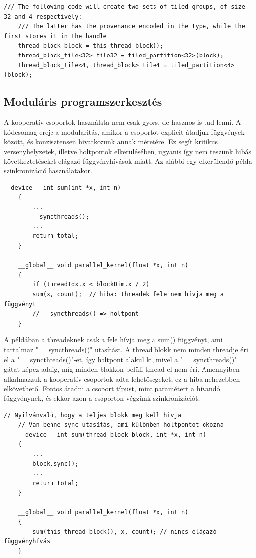 \begin{lstlisting}[style=CStyle]
	/// The following code will create two sets of tiled groups, of size 32 and 4 respectively:
	/// The latter has the provenance encoded in the type, while the first stores it in the handle
	thread_block block = this_thread_block();
	thread_block_tile<32> tile32 = tiled_partition<32>(block);
	thread_block_tile<4, thread_block> tile4 = tiled_partition<4>(block);
\end{lstlisting}

\subsection{Moduláris programszerkesztés}
A kooperatív csoportok használata nem csak gyors, de hasznos is tud lenni. A kódcsomag ereje a modularitás, amikor a csoportot explicit átadjuk függvények között, és konzisztensen hivatkozunk annak méretére. Ez segít kritikus versenyhelyzetek, illetve holtpontok elkerülésében, ugyanis így nem teszünk hibás következtetéseket elágazó függvényhívások miatt. Az alábbi egy elkerülendő példa szinkronizáció használatakor.
\begin{lstlisting}[style=CStyle]
	__device__ int sum(int *x, int n) 
	{
		...
		__syncthreads();
		...
		return total;
	}
	
	__global__ void parallel_kernel(float *x, int n)
	{
		if (threadIdx.x < blockDim.x / 2)
		sum(x, count);  // hiba: threadek fele nem hívja meg a függvényt
		// __syncthreads() => holtpont
	}
\end{lstlisting}

A példában a threadeknek csak a fele hívja meg a sum() függvényt, ami tartalmaz "\_\_syncthreads()" utasítást. A thread blokk nem minden threadje éri el a "\_\_syncthreads()"-et, így holtpont alakul ki, mivel a "\_\_syncthreads()" gátat képez addig, míg minden blokkon belüli thread el nem éri.
Amennyiben alkalmazzuk a kooperatív csoportok adta lehetőségeket, ez a hiba nehezebben elkövethető. Fontos átadni a csoport típust, mint paramétert a hívandó függvénynek, és ekkor azon a csoporton végzünk szinkronizációt.
\begin{lstlisting}[style=CStyle]
	// Nyilvánvaló, hogy a teljes blokk meg kell hivja
	// Van benne sync utasítás, ami különben holtpontot okozna
	__device__ int sum(thread_block block, int *x, int n) 
	{
		...
		block.sync();
		...
		return total;
	}
	
	__global__ void parallel_kernel(float *x, int n)
	{
		sum(this_thread_block(), x, count); // nincs elágazó függvényhívás
	}
\end{lstlisting}


